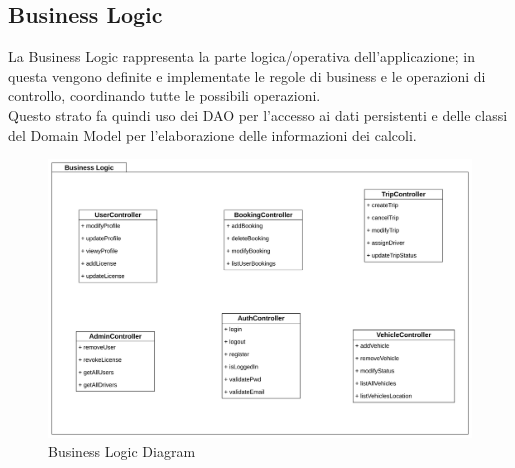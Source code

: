 \subsection{Business Logic}\label{subsec:BL}
La Business Logic rappresenta la parte logica/operativa dell'applicazione; in questa vengono definite e implementate le regole di business e le operazioni di controllo, coordinando tutte le possibili operazioni.\\
Questo strato fa quindi uso dei DAO per l'accesso ai dati persistenti e delle classi del Domain Model per l'elaborazione delle informazioni dei calcoli.
\begin{figure}[H]
    \centering
    \includegraphics[width=1\linewidth]{Images/BusinessLogic_diag.png}
    \caption{Business Logic Diagram}
    \label{fig:BLdiag}
\end{figure}

